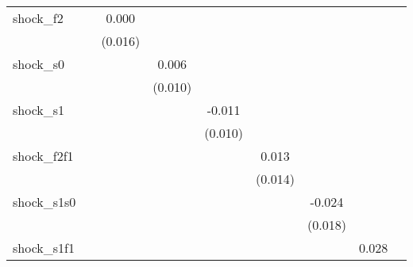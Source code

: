 {\begin{tabular}{l*{8}{c}}
\addlinespace
shock\_f2    &                     &       0.000         &                     &                     &                     &                     &                     &                     \\
            &                     &     (0.016)         &                     &                     &                     &                     &                     &                     \\
\addlinespace
shock\_s0    &                     &                     &       0.006         &                     &                     &                     &                     &                     \\
            &                     &                     &     (0.010)         &                     &                     &                     &                     &                     \\
\addlinespace
shock\_s1    &                     &                     &                     &      -0.011         &                     &                     &                     &                     \\
            &                     &                     &                     &     (0.010)         &                     &                     &                     &                     \\
\addlinespace
shock\_f2f1  &                     &                     &                     &                     &       0.013         &                     &                     &                     \\
            &                     &                     &                     &                     &     (0.014)         &                     &                     &                     \\
\addlinespace
shock\_s1s0  &                     &                     &                     &                     &                     &      -0.024         &                     &                     \\
            &                     &                     &                     &                     &                     &     (0.018)         &                     &                     \\
\addlinespace
shock\_s1f1  &                     &                     &                     &                     &                     &                     &       0.028         &                     \\

\end{tabular}}
